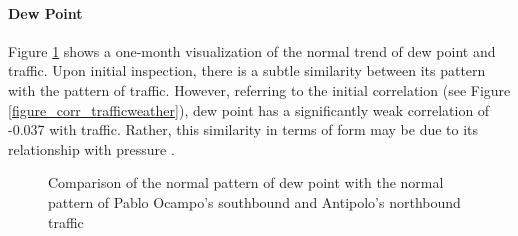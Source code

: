 
\paragraph{Dew Point}

Figure \ref{figure_traffic_vs_dewpoint} shows a one-month visualization of the normal trend of dew point and traffic. Upon initial inspection, there is a subtle similarity between its pattern with the pattern of traffic. However, referring to the initial correlation (see Figure \ref{figure_corr_trafficweather}), dew point has a significantly weak correlation of -0.037 with traffic. Rather, this similarity in terms of form may be due to its relationship with pressure .

\begin{figure}[!t] 
\centering
    \centering
      \captionsetup{justification=centering}
    \hfill
    \caption{Comparison of the normal pattern of dew point with the normal pattern of Pablo Ocampo’s southbound and Antipolo’s northbound traffic}

    \label{figure_traffic_vs_dewpoint}
\end{figure}


